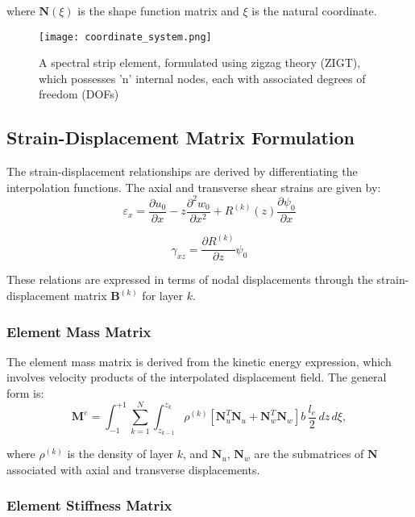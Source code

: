 \documentclass[12pt,a4paper]{report}
\begin{document}
where $\mathbf{N}(\xi)$ is the shape function matrix and $\xi$ is the natural coordinate.

\begin{figure}[htbp]
\centering
\texttt{[image: coordinate\_system.png]}
\caption{A spectral strip element, formulated using zigzag theory (ZIGT), which possesses 'n' internal nodes, each with associated degrees of freedom (DOFs)}
\label{fig:coordinate_system}
\end{figure}

\subsection*{Strain-Displacement Matrix Formulation}

The strain-displacement relationships are derived by differentiating the interpolation functions. The axial and transverse shear strains are given by:
\begin{equation}
    \varepsilon_x = \frac{\partial u_0}{\partial x} - z \frac{\partial^2 w_0}{\partial x^2} + R^{(k)}(z)\frac{\partial \psi_0}{\partial x}
\end{equation}

\begin{equation}
    \gamma_{xz} = \frac{\partial R^{(k)}}{\partial z} \psi_0 
\end{equation}


These relations are expressed in terms of nodal displacements through the strain-displacement matrix $\mathbf{B}^{(k)}$ for layer $k$.

\subsubsection*{Element Mass Matrix}

The element mass matrix is derived from the kinetic energy expression, which involves velocity products of the interpolated displacement field. The general form is:
\begin{equation}
    \mathbf{M}^e = \int_{-1}^{+1} \sum_{k=1}^{N} \int_{z_{k-1}}^{z_k} 
\rho^{(k)} \left[ \mathbf{N}_u^T \mathbf{N}_u + \mathbf{N}_w^T \mathbf{N}_w \right] b \, \frac{l_e}{2} \, dz \, d\xi,
\end{equation}

where $\rho^{(k)}$ is the density of layer $k$, and $\mathbf{N}_u$, $\mathbf{N}_w$ are the submatrices of $\mathbf{N}$ associated with axial and transverse displacements.

\subsubsection*{Element Stiffness Matrix}
\end{document}
